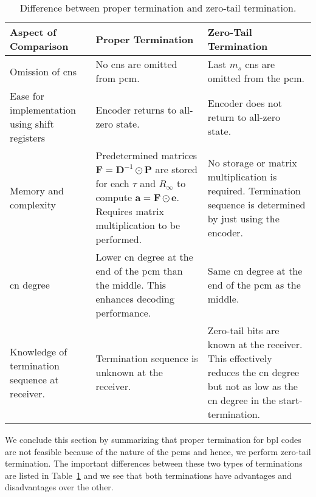 \begin{table}[htbp]
  \centering
  \begin{tabular}{|p{5cm}|p{5cm}|p{5cm}|}
    \hline
    \textbf{Aspect of Comparison} &\textbf{Proper Termination} &\textbf{Zero-Tail Termination}\\
    \hline
    \hline
    Omission of \glspl{cn} &No \glspl{cn} are omitted from \gls{pcm}. &Last $m_s$ \glspl{cn} are omitted from the \gls{pcm}.\\
    \hline
    Ease for implementation using shift registers &Encoder returns to all-zero state. &Encoder does not return to all-zero state.\\
    \hline
    Memory and complexity &Predetermined matrices $\mathbf{F}=\mathbf{D}^{-1}\odot\mathbf{P}$ are stored for each $\tau$ and $R_\infty$ to compute $\mathbf{a}=\mathbf{F}\odot\mathbf{e}$. Requires matrix multiplication to be performed. &No storage or matrix multiplication is required. Termination sequence is determined by just using the encoder.\\
    \hline
    \gls{cn} degree &Lower \gls{cn} degree at the end of the \gls{pcm} than the middle. This enhances decoding performance. &Same \gls{cn} degree at the end of the \gls{pcm} as the middle.\\
    \hline
    Knowledge of termination sequence at receiver. &Termination sequence is unknown at the receiver. &Zero-tail bits are known at the receiver. This effectively reduces the \gls{cn} degree but not as low as the \gls{cn} degree in the start-termination.\\
    \hline
  \end{tabular}
  \caption{Difference between proper termination and zero-tail termination.}
  \label{tab:diff_term}
\end{table}

We conclude this section by summarizing that proper termination for \gls{bpl} codes are not feasible because of the nature of the \glspl{pcm} and hence, we perform zero-tail termination. The important differences between these two types of terminations are listed in Table~\ref{tab:diff_term} and we see that both terminations have advantages and disadvantages over the other.